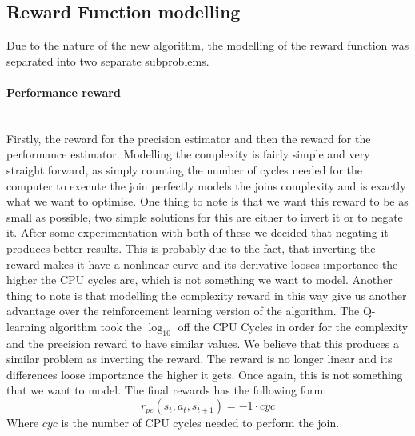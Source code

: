 \subsection{Reward Function modelling}
Due to the nature of the new algorithm, the modelling of the reward function was separated into two separate subproblems.
\paragraph{Performance reward}\mbox{}\\
Firstly, the reward for the precision estimator and then the reward for the performance estimator. Modelling the complexity is fairly simple and very straight forward, as simply counting the number of cycles needed for the computer to execute the join perfectly models the joins complexity and is exactly what we want to optimise. One thing to note is that we want this reward to be as small as possible, two simple solutions for this are either to invert it or to negate it. After some experimentation with both of these we decided that negating it produces better results. This is probably due to the fact, that inverting the reward makes it have a nonlinear curve and its derivative looses importance the higher the CPU cycles are, which is not something we want to model. Another thing to note is that modelling the complexity reward in this way give us another advantage over the reinforcement learning version of the algorithm. The Q-learning algorithm took the $\log_{10}$ off the CPU Cycles in order for the complexity and the precision reward to have similar values. We believe that this produces a similar problem as inverting the reward. The reward is no longer linear and its differences loose importance the higher it gets. Once again, this is not something that we want to model. The final rewards has the following form:
\begin{equation}
	r_{pe}(s_t,a_t,s_{t+1}) = -1 \cdot cyc
\end{equation}
Where $cyc$ is the number of CPU cycles needed to perform the join.
